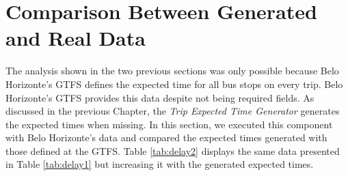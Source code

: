 \section{Comparison Between Generated and Real Data}
The analysis shown in the two previous sections was only possible because Belo Horizonte's GTFS defines the expected time for all
bus stops on every trip. Belo Horizonte's GTFS provides this data despite not being required fields. 
As discussed in the previous Chapter, the \textit{Trip Expected Time Generator} generates the expected times when missing. In this section, we executed this component with Belo Horizonte's data and compared the expected times generated
with those defined at the GTFS. Table \ref{tab:delay2} displays the same data presented in Table \ref{tab:delay1}
but increasing it with the generated expected times.

